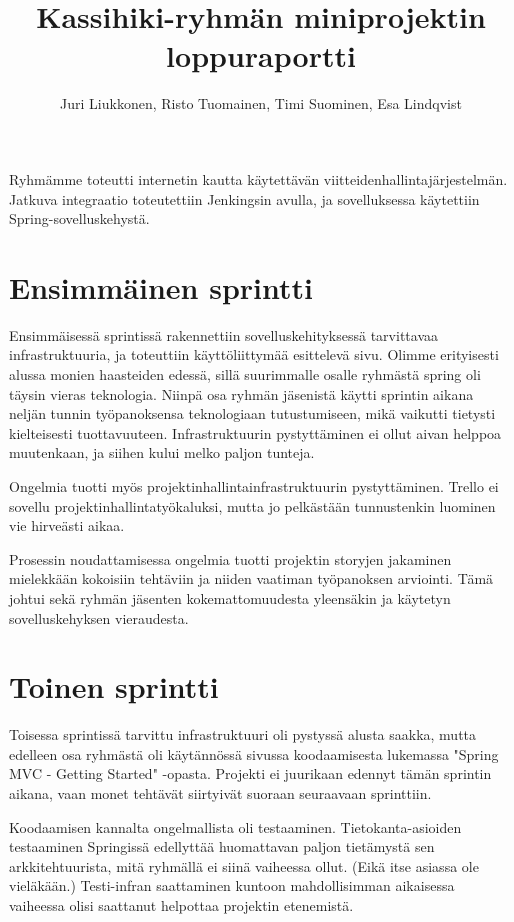 \documentclass[10pt,a4paper]{article}
\author{Juri Liukkonen,
	Risto Tuomainen, Timi Suominen, Esa Lindqvist}
\title{Kassihiki-ryhmän miniprojektin loppuraportti}
\begin{document}
\maketitle

\section*{}
Ryhmämme toteutti internetin kautta käytettävän
viitteidenhallintajärjestelmän. Jatkuva integraatio toteutettiin
Jenkingsin avulla, ja sovelluksessa käytettiin Spring-sovelluskehystä.

\section*{Ensimmäinen sprintti}
Ensimmäisessä sprintissä rakennettiin sovelluskehityksessä
tarvittavaa infrastruktuuria, ja toteuttiin käyttöliittymää
esittelevä sivu. Olimme erityisesti alussa monien haasteiden edessä,
sillä suurimmalle osalle ryhmästä spring oli täysin vieras teknologia.
Niinpä osa ryhmän jäsenistä käytti sprintin aikana neljän tunnin työpanoksensa
teknologiaan tutustumiseen, mikä vaikutti tietysti kielteisesti
tuottavuuteen. Infrastruktuurin pystyttäminen ei ollut aivan helppoa
muutenkaan, ja siihen kului melko paljon tunteja.

Ongelmia tuotti myös projektinhallintainfrastruktuurin pystyttäminen. Trello
ei sovellu projektinhallintatyökaluksi, mutta jo pelkästään tunnustenkin
luominen vie hirveästi aikaa.

Prosessin noudattamisessa ongelmia tuotti projektin storyjen jakaminen
mielekkään kokoisiin tehtäviin ja niiden vaatiman työpanoksen
arviointi. Tämä johtui sekä ryhmän jäsenten kokemattomuudesta yleensäkin ja
käytetyn sovelluskehyksen vieraudesta.

\section*{Toinen sprintti}
Toisessa sprintissä tarvittu infrastruktuuri oli pystyssä alusta saakka,
mutta edelleen osa ryhmästä oli käytännössä sivussa koodaamisesta
lukemassa "Spring MVC - Getting Started" -opasta. Projekti ei juurikaan
edennyt tämän sprintin aikana, vaan monet tehtävät siirtyivät
suoraan seuraavaan sprinttiin.

Koodaamisen kannalta ongelmallista oli testaaminen. Tietokanta-asioiden
testaaminen Springissä edellyttää huomattavan paljon tietämystä sen
arkkitehtuurista, mitä ryhmällä ei siinä vaiheessa ollut. (Eikä itse
asiassa ole vieläkään.) Testi-infran saattaminen kuntoon mahdollisimman
aikaisessa vaiheessa olisi saattanut helpottaa projektin etenemistä.
\end{document}
